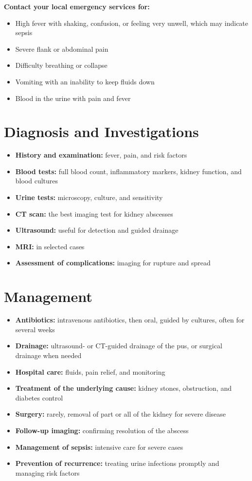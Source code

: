 \textbf{Contact your local emergency services for:}
\begin{itemize}
    \item High fever with shaking, confusion, or feeling very unwell, which may indicate sepsis
    \item Severe flank or abdominal pain
    \item Difficulty breathing or collapse
    \item Vomiting with an inability to keep fluids down
    \item Blood in the urine with pain and fever
\end{itemize}

\section*{Diagnosis and Investigations}
\begin{itemize}
    \item \textbf{History and examination:} fever, pain, and risk factors
    \item \textbf{Blood tests:} full blood count, inflammatory markers, kidney function, and blood cultures
    \item \textbf{Urine tests:} microscopy, culture, and sensitivity
    \item \textbf{CT scan:} the best imaging test for kidney abscesses
    \item \textbf{Ultrasound:} useful for detection and guided drainage
    \item \textbf{MRI:} in selected cases
    \item \textbf{Assessment of complications:} imaging for rupture and spread
\end{itemize}

\section*{Management}
\begin{itemize}
    \item \textbf{Antibiotics:} intravenous antibiotics, then oral, guided by cultures, often for several weeks
    \item \textbf{Drainage:} ultrasound- or CT-guided drainage of the pus, or surgical drainage when needed
    \item \textbf{Hospital care:} fluids, pain relief, and monitoring
    \item \textbf{Treatment of the underlying cause:} kidney stones, obstruction, and diabetes control
    \item \textbf{Surgery:} rarely, removal of part or all of the kidney for severe disease
    \item \textbf{Follow-up imaging:} confirming resolution of the abscess
    \item \textbf{Management of sepsis:} intensive care for severe cases
    \item \textbf{Prevention of recurrence:} treating urine infections promptly and managing risk factors
\end{itemize}

